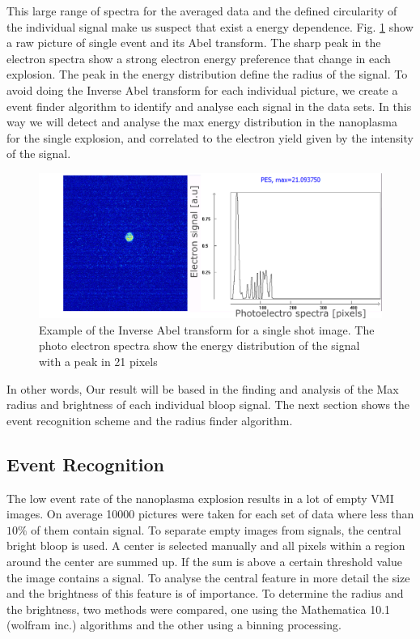 This large range of spectra for the averaged data and the defined circularity of the individual signal make us suspect that exist a energy dependence. Fig. \ref{fig:abeltransf} show a raw picture of single event and its  Abel transform. The sharp peak in the electron spectra show a strong electron energy preference that change in each explosion. The peak in the energy distribution define the radius of the signal. To avoid doing the Inverse Abel transform for each individual picture, we create a event finder algorithm to  identify and analyse each signal in the data sets. In this way we will detect and analyse the max energy distribution in the nanoplasma for the single explosion, and correlated to the electron yield given by the intensity of the signal.
 
\begin{figure}[h!]
 \centering
 \includegraphics[width=12 cm]{../Images/abel inverse transform.png}
 \caption[Abel inverse transform example]{Example of the Inverse Abel transform for a single shot image. The photo electron spectra show the energy distribution of the signal with a peak in 21 pixels}
 \label{fig:abeltransf}
 \end{figure}
   
In other words, Our result will be based in the finding and analysis of the Max radius and brightness of each individual bloop signal. The next section shows the event recognition scheme and the radius finder  algorithm.

\subsection{Event Recognition}

The low event rate of  the nanoplasma explosion results in a lot of empty VMI images. On average 10000 pictures were taken for each set of data where less than $10\%$ of them contain signal. To separate empty images from signals, the central bright bloop is used. A center is selected manually and all pixels within a region around the center are summed up. If the sum is above a certain threshold value the image contains a signal. To analyse the central feature in more detail the size and the brightness of this feature is of importance. To determine the radius and the brightness, two methods were compared, one using the Mathematica 10.1 (wolfram inc.) algorithms and the other using a binning processing.

